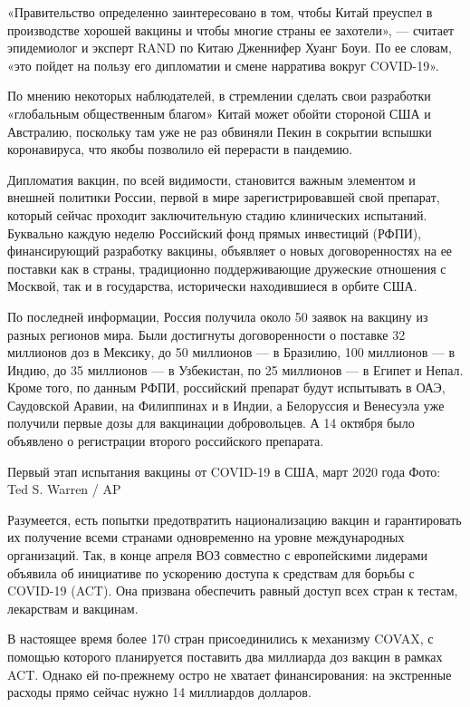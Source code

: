 «Правительство определенно заинтересовано в том, чтобы Китай преуспел в
производстве хорошей вакцины и чтобы многие страны ее захотели», — считает
эпидемиолог и эксперт RAND по Китаю Дженнифер Хуанг Боуи. По ее словам, «это
пойдет на пользу его дипломатии и смене нарратива вокруг COVID-19».

По мнению некоторых наблюдателей, в стремлении сделать свои разработки
«глобальным общественным благом» Китай может обойти стороной США и Австралию,
поскольку там уже не раз обвиняли Пекин в сокрытии вспышки коронавируса, что
якобы позволило ей перерасти в пандемию.

Дипломатия вакцин, по всей видимости, становится важным элементом и внешней
политики России, первой в мире зарегистрировавшей свой препарат, который сейчас
проходит заключительную стадию клинических испытаний. Буквально каждую неделю
Российский фонд прямых инвестиций (РФПИ), финансирующий разработку вакцины,
объявляет о новых договоренностях на ее поставки как в страны, традиционно
поддерживающие дружеские отношения с Москвой, так и в государства, исторически
находившиеся в орбите США.

По последней информации, Россия получила около 50 заявок на вакцину из разных
регионов мира. Были достигнуты договоренности о поставке 32 миллионов доз в
Мексику, до 50 миллионов — в Бразилию, 100 миллионов — в Индию, до 35 миллионов
— в Узбекистан, по 25 миллионов — в Египет и Непал. Кроме того, по данным РФПИ,
российский препарат будут испытывать в ОАЭ, Саудовской Аравии, на Филиппинах и
в Индии, а Белоруссия и Венесуэла уже получили первые дозы для вакцинации
добровольцев. А 14 октября было объявлено о регистрации второго российского
препарата.

Первый этап испытания вакцины от COVID-19 в США, март 2020 года
Фото: Ted S. Warren / AP

Разумеется, есть попытки предотвратить национализацию вакцин и гарантировать их
получение всеми странами одновременно на уровне международных организаций. Так,
в конце апреля ВОЗ совместно с европейскими лидерами объявила об инициативе по
ускорению доступа к средствам для борьбы с COVID-19 (ACT). Она призвана
обеспечить равный доступ всех стран к тестам, лекарствам и вакцинам.

В настоящее время более 170 стран присоединились к механизму COVAX, с помощью
которого планируется поставить два миллиарда доз вакцин в рамках ACT. Однако ей
по-прежнему остро не хватает финансирования: на экстренные расходы прямо сейчас
нужно 14 миллиардов долларов.

